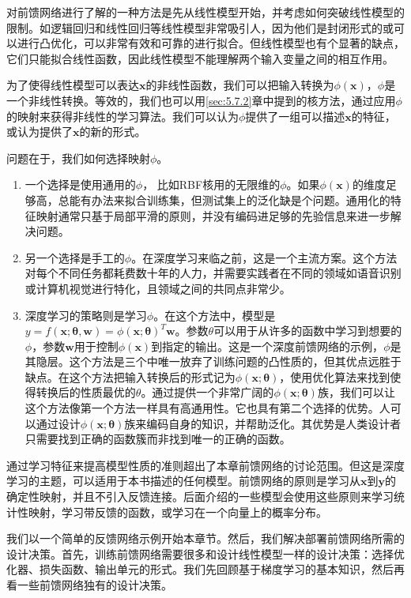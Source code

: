 \documentclass[a4paper,11pt]{book}
\begin{document}
对前馈网络进行了解的一种方法是先从线性模型开始，并考虑如何突破线性模型的限制。如逻辑回归和线性回归等线性模型非常吸引人，因为他们是封闭形式的或可以进行凸优化，可以非常有效和可靠的进行拟合。但线性模型也有个显著的缺点，它们只能拟合线性函数，因此线性模型不能理解两个输入变量之间的相互作用。


为了使得线性模型可以表达$\bm{x}$的非线性函数，我们可以把输入转换为$\phi(\bm{x})$，$\phi$是一个非线性转换。等效的，我们也可以用\ref{sec:5.7.2}章中提到的核方法，通过应用$\phi$的映射来获得非线性的学习算法。我们可以认为$\phi$提供了一组可以描述$\bm{x}$的特征，或认为提供了$\bm{x}$的新的形式。


问题在于，我们如何选择映射$\phi$。

\begin{enumerate}
 	\item 一个选择是使用通用的$\phi$， 比如RBF核用的无限维的$\phi$。如果$\phi(\bm{x})$的维度足够高，总能有办法来拟合训练集，但测试集上的泛化缺是个问题。通用化的特征映射通常只基于局部平滑的原则，并没有编码进足够的先验信息来进一步解决问题。
	\item 另一个选择是手工的$\phi$。在深度学习来临之前，这是一个主流方案。这个方法对每个不同任务都耗费数十年的人力，并需要实践者在不同的领域如语音识别或计算机视觉进行特化，且领域之间的共同点非常少。
	\item 深度学习的策略则是学习$\phi$。在这个方法中，模型是$y=f(\bm{x};\bm{\theta},\bm{w}) = \phi(\bm{x};\bm{\theta})^T\bm{w}$。参数$\theta$可以用于从许多的函数中学习到想要的$\phi$，参数$\bm{w}$用于控制$\phi(\bm{x})$到指定的输出。这是一个深度前馈网络的示例，$\phi$是其隐层。这个方法是三个中唯一放弃了训练问题的凸性质的，但其优点远胜于缺点。在这个方法把输入转换后的形式记为$\phi(\bm{x};\bm{\theta})$，使用优化算法来找到使得转换后的性质最优的$\theta$。通过提供一个非常广阔的$\phi(\bm{x};\bm{\theta})$族，我们可以让这个方法像第一个方法一样具有高通用性。它也具有第二个选择的优势。人可以通过设计$\phi(\bm{x};\bm{\theta})$族来编码自身的知识，并帮助泛化。其优势是人类设计者只需要找到正确的函数簇而非找到唯一的正确的函数。
\end{enumerate}


通过学习特征来提高模型性质的准则超出了本章前馈网络的讨论范围。但这是深度学习的主题，可以适用于本书描述的任何模型。前馈网络的原则是学习从$\bm{x}$到$\bm{y}$的确定性映射，并且不引入反馈连接。后面介绍的一些模型会使用这些原则来学习统计性映射，学习带反馈的函数，或学习在一个向量上的概率分布。


我们以一个简单的反馈网络示例开始本章节。然后，我们解决部署前馈网络所需的设计决策。首先，训练前馈网络需要很多和设计线性模型一样的设计决策：选择优化器、损失函数、输出单元的形式。我们先回顾基于梯度学习的基本知识，然后再看一些前馈网络独有的设计决策。
\end{document}
